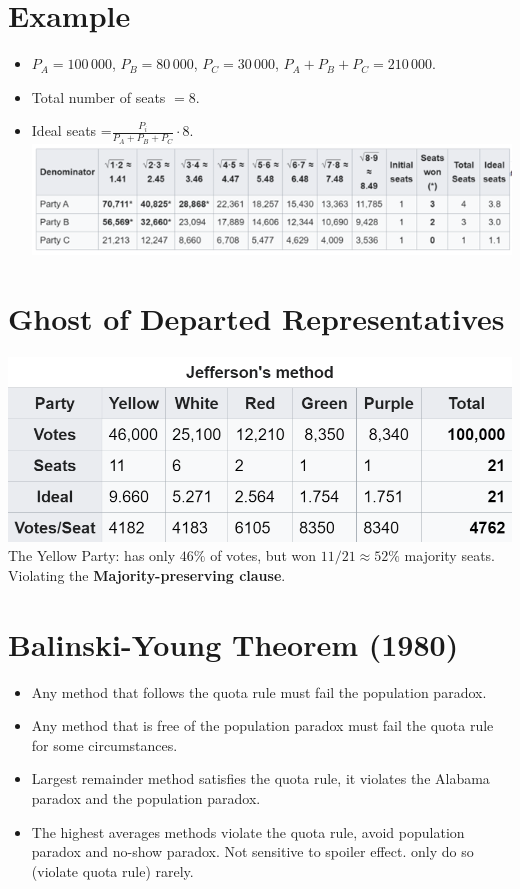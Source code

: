 \documentclass[
  letterpaper,
  DIV=11,
  numbers=noendperiod]{scrreprt}
\providecommand{\tightlist}{%
  \setlength{\itemsep}{0pt}\setlength{\parskip}{0pt}}\usepackage{longtable,booktabs,array}
\begin{document}
\section{Example}\label{example}

\begin{itemize}
\tightlist
\item
  \(P_A=100\,000\), \(P_B=80\,000\), \(P_C=30\,000\),
  \(P_A+P_B+P_C=210\,000\).
\item
  Total number of seats \(=8\).
\item
  Ideal seats =\(\frac{P_i}{P_A+P_B+P_C}\cdot 8\).
  \includegraphics[width=10.41667in,height=\textheight]{images/Huntington-Hill.png}
\end{itemize}

\section{Ghost of Departed
Representatives}\label{ghost-of-departed-representatives}

\includegraphics[width=10.41667in,height=\textheight]{images/jefferson.png}
The Yellow Party: has only \(46\%\) of votes, but won
\(11/21\approx 52\%\) majority seats. Violating the
\textbf{Majority-preserving clause}.

\section{Balinski-Young Theorem
(1980)}\label{balinski-young-theorem-1980}

\begin{itemize}
\item
  Any method that follows the quota rule must fail the population
  paradox.
\item
  Any method that is free of the population paradox must fail the quota
  rule for some circumstances.
\item
  Largest remainder method satisfies the quota rule, it violates the
  Alabama paradox and the population paradox.
\item
  The highest averages methods violate the quota rule, avoid population
  paradox and no-show paradox. Not sensitive to spoiler effect. only do
  so (violate quota rule) rarely.
\end{itemize}
\end{document}
